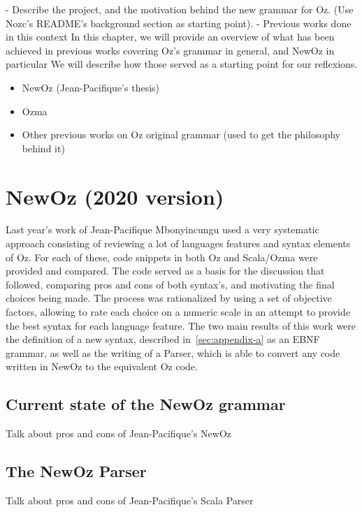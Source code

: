 
- Describe the project, and the motivation behind the new grammar for Oz. (Use Nozc's README's background section as starting point).\newline
- Previous works done in this context\newline
In this chapter, we will provide an overview of what has been achieved in previous works covering Oz's grammar in general, and NewOz in particular
We will describe how those served as a starting point for our reflexions.\newline
\begin{itemize}
    \item NewOz (Jean-Pacifique's thesis)
    \item Ozma
    \item Other previous works on Oz original grammar (used to get the philosophy behind it)
\end{itemize}

\section{NewOz (2020 version)}\label{sec:ch1JPNewOz}
Last year's work of Jean-Pacifique Mbonyincungu used a very systematic approach consisting of reviewing a lot of languages features and syntax elements of Oz.
For each of these, code snippets in both Oz and Scala/Ozma were provided and compared.
The code served as a basis for the discussion that followed, comparing pros and cons of both syntax's, and motivating the final choices being made.
The process was rationalized by using a set of objective factors, allowing to rate each choice on a numeric scale in an attempt to provide the best syntax for each language feature.
\newline
The two main results of this work were the definition of a new syntax, described in~\ref{sec:appendix-a} as an EBNF grammar, as well as the writing of a Parser, which is able to convert any code written in NewOz to the equivalent Oz code.

\subsection{Current state of the NewOz grammar}\label{subsec:ch1CurrentGrammar}
Talk about pros and cons of Jean-Pacifique's NewOz

\subsection{The NewOz Parser}\label{subsec:ch1CurrentParser}
Talk about pros and cons of Jean-Pacifique's Scala Parser

